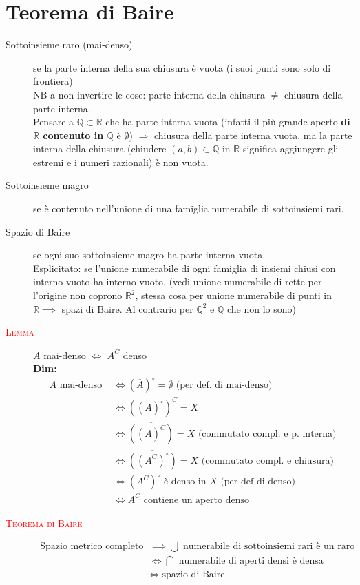 \documentclass[a4paper,10pt]{article}
\newcommand{\myth}{\normalfont \scshape \textcolor{red}}
\theoremstyle{remark}
\theoremstyle{definition}
\begin{document}
\section*{Teorema di Baire}
\begin{description}
    \item[Sottoinsieme raro (mai-denso)] se la parte interna della sua chiusura è vuota (i suoi punti sono solo di frontiera)\\
    NB a non invertire le cose: parte interna della chiusura $\ne$ chiusura della parte interna. \\
    Pensare a $\mathbb{Q} \subset \mathbb{R}$ che ha parte interna vuota (infatti il più grande aperto \textbf{di $\mathbb{R}$ contenuto in $\mathbb{Q}$} è $\emptyset$) $\Rightarrow$ chiusura della parte interna vuota, ma la parte interna della chiusura (chiudere $(a,b) \subset \mathbb{Q}$ in $\mathbb{R}$ significa aggiungere gli estremi e i numeri razionali) è non vuota.
    \item[Sottoinsieme magro] se è contenuto nell'unione di una famiglia numerabile di sottoinsiemi rari.
    \item[Spazio di Baire] se ogni suo sottoinsieme magro ha parte interna vuota. \\
    Esplicitato: se l'unione numerabile di ogni famiglia di insiemi chiusi con interno vuoto ha interno vuoto. (vedi unione numerabile di rette per l'origine non coprono $\mathbb{R}^2$, stessa cosa per unione numerabile di punti in $\mathbb{R} \implies$ spazi di Baire. Al contrario per  $\mathbb{Q}^2$ e $\mathbb{Q}$ che non lo sono)
    \item[\myth{Lemma}] $A$ mai-denso $\iff$ $A^C$ denso \\
    \textbf{Dim:}
    \begin{align*}
        A \mbox{ mai-denso } &\iff (\overline{A})^\circ = \emptyset \mbox{ (per def. di mai-denso)}\\
        &\iff ((\overline{A})^\circ)^C = X \\
        &\iff \overline{((\overline{A})^C)} = X \mbox{ (commutato compl. e p. interna)}\\
        &\iff \overline{((A^C)^\circ)} = X \mbox{ (commutato compl. e chiusura)}\\
        &\iff (A^C)^\circ \mbox{ è denso in } X \mbox{ (per def di denso)}\\
        &\iff A^C \mbox{ contiene un aperto denso}
    \end{align*}
    \item[\myth{Teorema di Baire}] 
    \begin{align*}
       \mbox{ Spazio metrico completo } &\implies \bigcup \mbox{ numerabile  di sottoinsiemi rari è un raro } \\
    &\iff \bigcap \mbox{ numerabile di aperti densi è densa } \\
    &\iff \mbox{ spazio di Baire}
    \end{align*}
    
\end{description}
\end{document}

